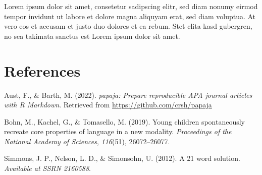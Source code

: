 \documentclass[
  man]{apa6}
\newlength{\cslhangindent}
\newenvironment{CSLReferences}[2] %
 {\begin{list}{}{%
  \setlength{\itemindent}{0pt}
  \setlength{\leftmargin}{0pt}
  \setlength{\parsep}{0pt}
  \ifodd #1
   \setlength{\leftmargin}{\cslhangindent}
   \setlength{\itemindent}{-1\cslhangindent}
  \fi
  \setlength{\itemsep}{#2\baselineskip}}}
 {\end{list}}
\begin{document}
Lorem ipsum dolor sit amet, consetetur sadipscing elitr, sed diam nonumy eirmod tempor invidunt ut labore et dolore magna aliquyam erat, sed diam voluptua. At vero eos et accusam et justo duo dolores et ea rebum. Stet clita kasd gubergren, no sea takimata sanctus est Lorem ipsum dolor sit amet.

\newpage

\section{References}\label{references}

\label{refs}
\begin{CSLReferences}{1}{0}
Aust, F., \& Barth, M. (2022). \emph{{papaja}: {Prepare} reproducible {APA} journal articles with {R Markdown}}. Retrieved from \url{https://github.com/crsh/papaja}

Bohn, M., Kachel, G., \& Tomasello, M. (2019). Young children spontaneously recreate core properties of language in a new modality. \emph{Proceedings of the National Academy of Sciences}, \emph{116}(51), 26072--26077.

Simmons, J. P., Nelson, L. D., \& Simonsohn, U. (2012). A 21 word solution. \emph{Available at SSRN 2160588}.

\end{CSLReferences}
\end{document}

